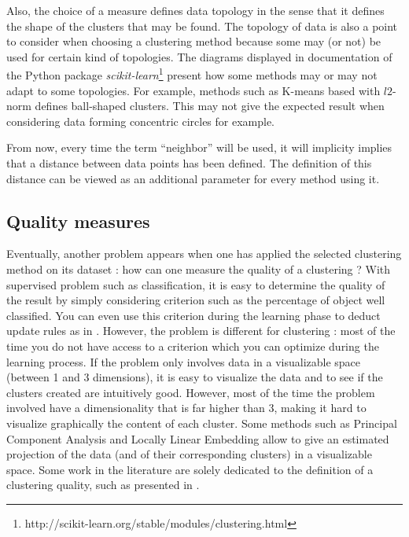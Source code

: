 \documentclass[a4paper]{report}
\begin{document}
    Also, the choice of a measure defines data topology in the sense that it defines the shape of the clusters that may be found. The topology of data is also a point to consider when choosing a clustering method because some may (or not) be used for certain kind of topologies. The diagrams displayed in documentation of the Python package \textit{scikit-learn}\footnote{http://scikit-learn.org/stable/modules/clustering.html} present how some methods may or may not adapt to some topologies. For example, methods such as K-means based with $l2$-norm defines ball-shaped clusters. This may not give the expected result when considering data forming concentric circles for example.

    From now, every time the term ``neighbor'' will be used, it will implicity implies that a distance between data points has been defined. The definition of this distance can be viewed as an additional parameter for every method using it.

    \subsection{Quality measures}
    \label{sec:quality_measures}
    Eventually, another problem appears when one has applied the selected clustering method on its dataset : how can one measure the quality of a clustering ? With supervised problem such as classification, it is easy to determine the quality of the result by simply considering criterion such as the percentage of object well classified. You can even use this criterion during the learning phase to deduct update rules as in \cite{vincent2010stacked}. However, the problem is different for clustering : most of the time you do not have access to a criterion which you can optimize during the learning process. If the problem only involves data in a visualizable space (between 1 and 3 dimensions), it is easy to visualize the data and to see if the clusters created are intuitively good. However, most of the time the problem involved have a dimensionality that is far higher than 3, making it hard to visualize graphically the content of each cluster. Some methods such as Principal Component Analysis \cite{wold1987principal} and Locally Linear Embedding \cite{roweis2000nonlinear} allow to give an estimated projection of the data (and of their corresponding clusters) in a visualizable space. Some work in the literature are solely dedicated to the definition of a clustering quality, such as presented in \cite{ben2009measures}.
\end{document}
